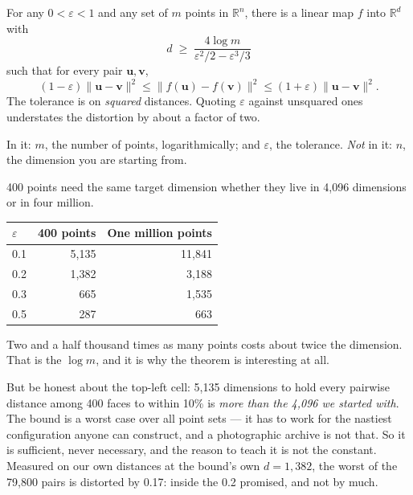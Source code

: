 \documentclass[11pt,a4paper]{article}
\begin{document}
\begin{derivbox}[title={The Johnson--Lindenstrauss lemma}]
For any $0 < \varepsilon < 1$ and any set of $m$ points in $\mathbb{R}^n$,
there is a linear map $f$ into $\mathbb{R}^d$ with
\[ d \;\ge\; \frac{4\log m}{\varepsilon^{2}/2 - \varepsilon^{3}/3} \]
such that for every pair $\mathbf{u},\mathbf{v}$,
\[ (1-\varepsilon)\lVert\mathbf{u}-\mathbf{v}\rVert^2
   \le \lVert f(\mathbf{u})-f(\mathbf{v})\rVert^2
   \le (1+\varepsilon)\lVert\mathbf{u}-\mathbf{v}\rVert^2. \]
The tolerance is on \emph{squared} distances. Quoting $\varepsilon$ against
unsquared ones understates the distortion by about a factor of two.
\end{derivbox}

\begin{keybox}[title={Read the formula again. What is missing?}]
In it: $m$, the number of points, logarithmically; and $\varepsilon$, the
tolerance. \emph{Not} in it: $n$, the dimension you are starting from.

400 points need the same target dimension whether they live in 4{,}096
dimensions or in four million.
\end{keybox}

\begin{center}
\small
\begin{tabular}{lrr}
\toprule
$\varepsilon$ & \textbf{400 points} & \textbf{One million points} \\
\midrule
0.1 & 5{,}135 & 11{,}841 \\
0.2 & 1{,}382 &  3{,}188 \\
0.3 &   665 &  1{,}535 \\
0.5 &   287 &    663 \\
\bottomrule
\end{tabular}
\end{center}

Two and a half thousand times as many points costs about twice the dimension.
That is the $\log m$, and it is why the theorem is interesting at all.

But be honest about the top-left cell: 5{,}135 dimensions to hold every
pairwise distance among 400 faces to within 10\% is \emph{more than the 4{,}096
we started with}. The bound is a worst case over all point sets --- it has to
work for the nastiest configuration anyone can construct, and a photographic
archive is not that. So it is sufficient, never necessary, and the reason to
teach it is not the constant. Measured on our own distances at the bound's own
$d = 1{,}382$, the worst of the 79{,}800 pairs is distorted by 0.17: inside the
0.2 promised, and not by much.
\end{document}
